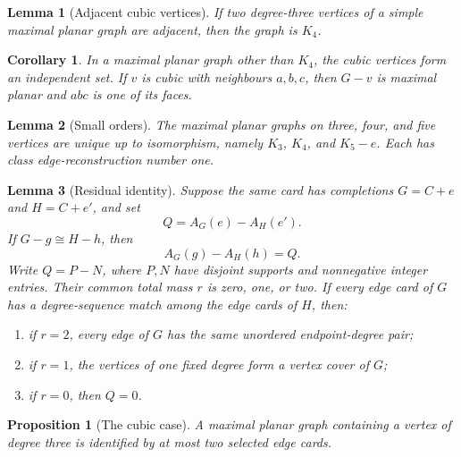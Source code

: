 \documentclass[10pt,a4paper]{amsart}
\newtheorem{lemma}{Lemma}
\newtheorem{proposition}{Proposition}
\newtheorem{corollary}{Corollary}
\begin{document}
\begin{lemma}[Adjacent cubic vertices]\label{lem:adjacent-cubic}
If two degree-three vertices of a simple maximal planar graph are adjacent,
then the graph is \(K_4\).
\end{lemma}

\begin{corollary}\label{cor:cubic-independent}
In a maximal planar graph other than \(K_4\), the cubic vertices form an
independent set.  If \(v\) is cubic with neighbours \(a,b,c\), then
\(G-v\) is maximal planar and \(abc\) is one of its faces.
\end{corollary}

\begin{lemma}[Small orders]\label{lem:small-orders}
The maximal planar graphs on three, four, and five vertices are unique up to
isomorphism, namely \(K_3\), \(K_4\), and \(K_5-e\).  Each has class
edge-reconstruction number one.
\end{lemma}

\begin{lemma}[Residual identity]\label{lem:residual}
Suppose the same card has completions \(G=C+e\) and \(H=C+e'\), and set
\[
                  Q=A_G(e)-A_H(e').
\]
If \(G-g\cong H-h\), then
\[
                  A_G(g)-A_H(h)=Q.                 \tag{C.1}\label{eq:residual}
\]
Write \(Q=P-N\), where \(P,N\) have disjoint supports and nonnegative
integer entries.  Their common total mass \(r\) is zero, one, or two.  If
every edge card of \(G\) has a degree-sequence match among the edge cards of
\(H\), then:
\begin{enumerate}[label=\textup{(\roman*)},leftmargin=2.2em]
\item if \(r=2\), every edge of \(G\) has the same unordered endpoint-degree
pair;
\item if \(r=1\), the vertices of one fixed degree form a vertex cover of
\(G\);
\item if \(r=0\), then \(Q=0\).
\end{enumerate}
\end{lemma}

\begin{proposition}[The cubic case]\label{prop:cubic}
A maximal planar graph containing a vertex of degree three is identified by
at most two selected edge cards.
\end{proposition}
\end{document}
